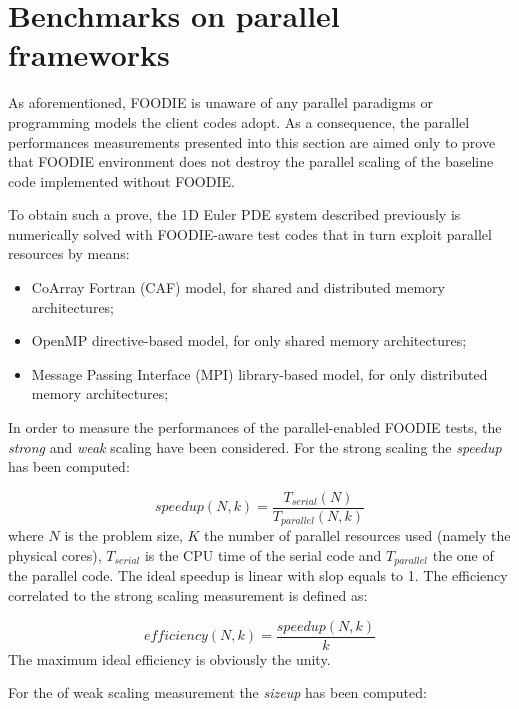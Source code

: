 \section{Benchmarks on parallel frameworks}\label{sec:parallel}

As aforementioned, FOODIE is unaware of any parallel paradigms or programming models the client codes adopt. As a consequence, the parallel performances measurements presented into this section are aimed only to prove that FOODIE environment does not destroy the parallel scaling of the baseline code implemented without FOODIE.

To obtain such a prove, the 1D Euler PDE system described previously is numerically solved with FOODIE-aware test codes that in turn exploit parallel resources by means:

\begin{itemize}
  \item CoArray Fortran (CAF) model, for shared and distributed memory architectures;
  \item OpenMP directive-based model, for only shared memory architectures;
  \item Message Passing Interface (MPI) library-based model, for only distributed memory architectures;
  \end{itemize}

In order to measure the performances of the parallel-enabled FOODIE tests, the \emph{strong} and \emph{weak} scaling have been considered. For the strong scaling the \emph{speedup} has been computed:

\begin{equation}
  speedup(N, k) = \frac{T_{serial}(N)}{T_{parallel}(N, k)}
  \label{eq:strong-scaling-speedup}
\end{equation}
where $N$ is the problem size, $K$ the number of parallel resources used (namely the physical cores), $T_{serial}$ is the CPU time of the serial code and $T_{parallel}$ the one of the parallel code. The ideal speedup is linear with slop equals to 1. The efficiency correlated to the strong scaling measurement is defined as:

\begin{equation}
  efficiency(N, k) = \frac{speedup(N, k)}{k}
  \label{eq:strong-scaling-efficiency}
\end{equation}
The maximum ideal efficiency is obviously the unity.

For the of weak scaling measurement the \emph{sizeup} has been computed:

